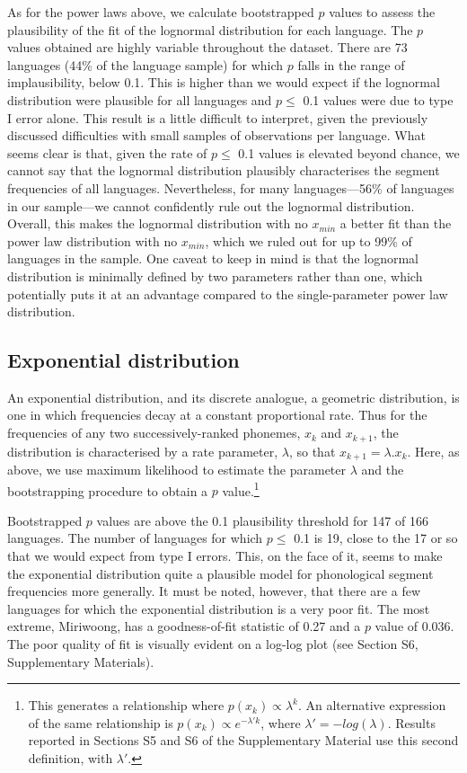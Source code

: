 As for the power laws above, we calculate bootstrapped \(p\) values to assess the plausibility of the fit of the lognormal distribution for each language. The \(p\) values obtained are highly variable throughout the dataset. There are 73 languages (44\% of the language sample) for which \(p\) falls in the range of implausibility, below 0.1. This is higher than we would expect if the lognormal distribution were plausible for all languages and \(p \leq\) 0.1 values were due to type I error alone. This result is a little difficult to interpret, given the previously discussed difficulties with small samples of observations per language. What seems clear is that, given the rate of \(p \leq\) 0.1 values is elevated beyond chance, we cannot say that the lognormal distribution plausibly characterises the segment frequencies of all languages. Nevertheless, for many languages---56\% of languages in our sample---we cannot confidently rule out the lognormal distribution. Overall, this makes the lognormal distribution with no \(x_{min}\) a better fit than the power law distribution with no \(x_{min}\), which we ruled out for up to 99\% of languages in the sample. One caveat to keep in mind is that the lognormal distribution is minimally defined by two parameters rather than one, which potentially puts it at an advantage compared to the single-parameter power law distribution.

\hypertarget{exponential-distribution}{%
\subsection{Exponential distribution}\label{exponential-distribution}}

An exponential distribution, and its discrete analogue, a geometric distribution, is one in which frequencies decay at a constant proportional rate. Thus for the frequencies of any two successively-ranked phonemes, \(x_k\) and \(x_{k+1}\), the distribution is characterised by a rate parameter, \(\lambda\), so that \(x_{k+1} = \lambda.x_k\). Here, as above, we use maximum likelihood to estimate the parameter \(\lambda\) and the bootstrapping procedure to obtain a \(p\) value.\footnote{This generates a relationship where \(p(x_k) \propto \lambda^k\). An alternative expression of the same relationship is \(p(x_k) \propto e^{-\lambda' k}\), where \(\lambda' = -log(\lambda)\). Results reported in Sections S5 and S6 of the Supplementary Material use this second definition, with \(\lambda'\).}

Bootstrapped \(p\) values are above the 0.1 plausibility threshold for 147 of 166 languages. The number of languages for which \(p \leq\) 0.1 is 19, close to the 17 or so that we would expect from type I errors. This, on the face of it, seems to make the exponential distribution quite a plausible model for phonological segment frequencies more generally. It must be noted, however, that there are a few languages for which the exponential distribution is a very poor fit. The most extreme, Miriwoong, has a goodness-of-fit statistic of 0.27 and a \(p\) value of 0.036. The poor quality of fit is visually evident on a log-log plot (see Section S6, Supplementary Materials).

